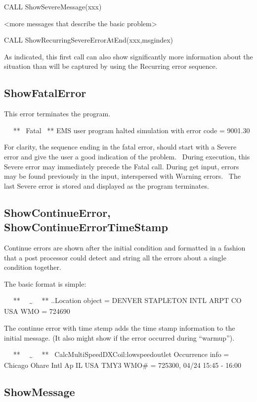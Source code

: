 CALL ShowSevereMessage(xxx)

\textless{}more messages that describe the basic problem\textgreater{}

CALL ShowRecurringSevereErrorAtEnd(xxx,msgindex)

As indicated, this first call can also show significantly more information about the situation than will be captured by using the Recurring error sequence.

\subsection{ShowFatalError}\label{showfatalerror}

This error terminates the program.

~~ **~ Fatal~ ** EMS user program halted simulation with error code = 9001.30

For clarity, the sequence ending in the fatal error, should start with a Severe error and give the user a good indication of the problem.~ During execution, this Severe error may immediately precede the Fatal call. During get input, errors may be found previously in the input, interspersed with Warning errors.~ The last Severe error is stored and displayed as the program terminates.

\subsection{ShowContinueError, ShowContinueErrorTimeStamp}\label{showcontinueerror-showcontinueerrortimestamp}

Continue errors are shown after the initial condition and formatted in a fashion that a post processor could detect and string all the errors about a single condition together.

The basic format is simple:

~~ **~~ \textsubscript{\textasciitilde{}}~~ ** ..Location object = DENVER STAPLETON INTL ARPT CO USA WMO = 724690

The continue error with time stemp adds the time stamp information to the initial message. (It also might show if the error occurred during ``warmup'').

~~ **~~ \textsubscript{\textasciitilde{}}~~ **~ CalcMultiSpeedDXCoil:lowspeedoutlet Occurrence info = Chicago Ohare Intl Ap IL USA TMY3 WMO\# = 725300, 04/24 15:45 - 16:00

\subsection{ShowMessage}\label{showmessage}

